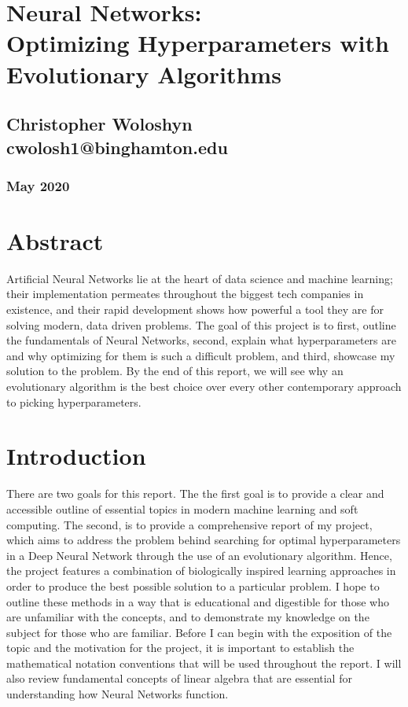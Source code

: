 \documentclass[12pt]{report}
\begin{document}
\chapter*{Neural Networks:\\\Large Optimizing Hyperparameters with Evolutionary Algorithms}
\section*{Christopher Woloshyn\\\large cwolosh1@binghamton.edu}
\subsection*{May 2020}

\tableofcontents
\lstlistoflistings

\chapter*{Abstract}
Artificial Neural Networks lie at the heart of data science and machine learning; their implementation permeates throughout the biggest tech companies in existence, and their rapid development shows how powerful a tool they are for solving modern, data driven problems.
The goal of this project is to first, outline the fundamentals of Neural Networks, second, explain what hyperparameters are and why optimizing for them is such a difficult problem, and third, showcase my solution to the problem.
By the end of this report, we will see why an evolutionary algorithm is the best choice over every other contemporary approach to picking hyperparameters.

\chapter{Introduction}
There are two goals for this report.
The the first goal is to provide a clear and accessible outline of essential topics in modern machine learning and soft computing.
The second, is to provide a comprehensive report of my project, which aims to address the problem behind searching for optimal hyperparameters in a Deep Neural Network through the use of an evolutionary algorithm.
Hence, the project features a combination of biologically inspired learning approaches in order to produce the best possible solution to a particular problem. I hope to outline these methods in a way that is educational and digestible for those who are unfamiliar with the concepts, and to demonstrate my knowledge on the subject for those who are familiar. Before I can begin with the exposition of the topic and the motivation for the project, it is important to establish the mathematical notation conventions that will be used throughout the report. I will also review fundamental concepts of linear algebra that are essential for understanding how Neural Networks function.
\end{document}
